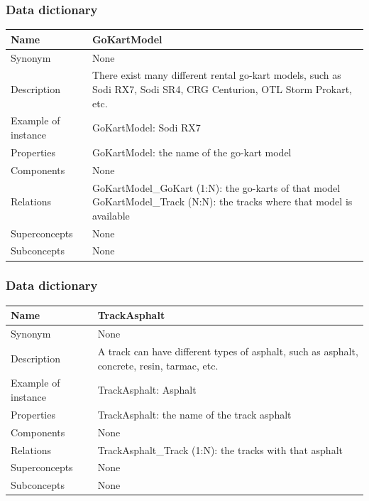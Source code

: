 \documentclass{beamer}
\begin{document}
\begin{frame}
    \frametitle{Data dictionary}
    \begin{table}
    \tiny
    \begin{tabular}{|p{2cm}|p{6cm}|}
    \hline
    Name & \textbf{GoKartModel} \\
    \hline
    Synonym & None \\
    \hline
    Description & There exist many different rental go-kart models,
    such as Sodi RX7, Sodi SR4, CRG Centurion, OTL Storm Prokart, etc. \\
    \hline
    Example of instance &
    GoKartModel: Sodi RX7 \\
    \hline
    Properties &
    GoKartModel: the name of the go-kart model \\
    \hline
    Components & None \\
    \hline
    Relations &
    GoKartModel\_GoKart (1:N): the go-karts of that model \newline
    GoKartModel\_Track (N:N): the tracks where that model is available\\
    \hline
    Superconcepts & None \\
    \hline
    Subconcepts & None \\
    \hline
    \end{tabular}
    \end{table}
\end{frame}


\begin{frame}
    \frametitle{Data dictionary}
    \begin{table}
    \tiny
    \begin{tabular}{|p{2cm}|p{6cm}|}
    \hline
    Name & \textbf{TrackAsphalt} \\
    \hline
    Synonym & None \\
    \hline
    Description & A track can have different types of asphalt,
    such as asphalt, concrete, resin, tarmac, etc. \\
    \hline
    Example of instance &
    TrackAsphalt: Asphalt \\
    \hline
    Properties &
    TrackAsphalt: the name of the track asphalt \\
    \hline
    Components & None \\
    \hline
    Relations &
    TrackAsphalt\_Track (1:N): the tracks with that asphalt \\
    \hline
    Superconcepts & None \\
    \hline
    Subconcepts & None \\
    \hline
    \end{tabular}
    \end{table}
\end{frame}
\end{document}
